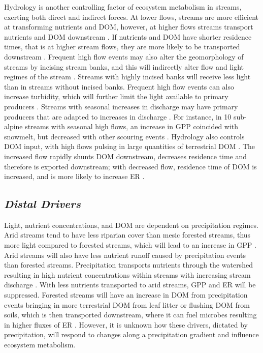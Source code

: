Hydrology is another controlling factor of ecosystem metabolism in streams, exerting both direct and indirect forces. At lower flows, streams are more efficient at transforming nutrients and DOM, however, at higher flows streams transport nutrients and DOM downstream \cite{fisher_temporal_1982, hall_hydrologic_2009}. If nutrients and DOM have shorter residence times, that is at higher stream flows, they are more likely to be transported downstream \cite{creed_regulation_1996, casas-ruiz_tale_2017}. Frequent high flow events may also alter the geomorphology of streams by incising stream banks, and this will indirectly alter flow and light regimes of the stream \cite{blaszczak_scoured_2019}. Streams with highly incised banks will receive less light than in streams without incised banks. Frequent high flow events can also increase turbidity, which will further limit the light available to primary producers \cite{hall_turbidity_2015, blaszczak_scoured_2019}. Streams with seasonal increases in discharge may have primary producers that are adapted to increases in discharge \cite{lytle_adaptation_2004}. For instance, in 10 sub-alpine streams with seasonal high flows, an increase in GPP coincided with snowmelt, but decreased with other scouring events \cite{ulseth_climate-induced_2018}. Hydrology also controls DOM input, with high flows pulsing in large quantities of terrestrial DOM \cite{fasching_hydrology_2016, raymond_hydrological_2016}. The increased flow rapidly shunts DOM downstream, decreases residence time and therefore is exported downstream; with decreased flow, residence time of DOM is increased, and is more likely to increase ER \cite{battin_biophysical_2008, raymond_hydrological_2016}.


\subsection{\textit{Distal Drivers}}
Light, nutrient concentrations, and DOM are dependent on precipitation regimes. Arid streams tend to have less riparian cover than mesic forested streams, thus more light compared to forested streams, which will lead to an increase in GPP \cite{davis_high_2012, hall_turbidity_2015}. Arid streams will also have less nutrient runoff caused by precipitation events than forested streams. Precipitation transports nutrients through the watershed resulting in high nutrient concentrations within streams with increasing stream discharge \cite{house_hysteresis_1998, ulseth_natural_2005}. With less nutrients transported to arid streams, GPP and ER will be suppressed. Forested streams will have an increase in DOM from precipitation events bringing in more terrestrial DOM from leaf litter or flushing DOM from soils, which is then transported downstream, where it can fuel microbes resulting in higher fluxes of ER \cite{sawyer_hydrologic_2014, raymond_hydrological_2016}. However, it is unknown how these drivers, dictated by precipitation, will respond to changes along a precipitation gradient and influence ecosystem metabolism.



